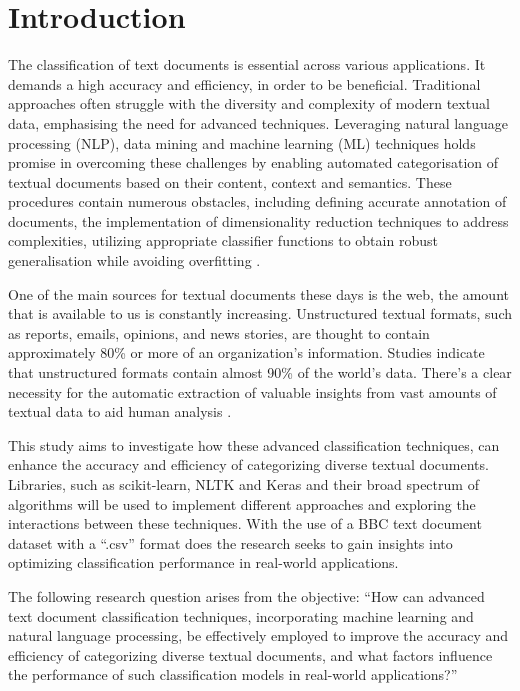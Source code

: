 \chapter{Introduction}

The classification of text documents is essential across various applications. It demands a high accuracy and efficiency, in order to be beneficial. Traditional approaches often struggle with the diversity and complexity of modern textual data, emphasising the need for advanced techniques. Leveraging natural language processing (NLP), data mining and machine learning (ML) techniques holds promise in overcoming these challenges by enabling automated categorisation of textual documents based on their content, context and semantics. These procedures contain numerous obstacles, including defining accurate annotation of documents, the implementation of dimensionality reduction techniques to address complexities, utilizing appropriate classifier functions to obtain robust generalisation while avoiding overfitting \citep{aurangzeb_review_2010}.

One of the main sources for textual documents these days is the web, the amount that is available to us is constantly increasing. Unstructured textual formats, such as reports, emails, opinions, and news stories, are thought to contain approximately 80\% or more of an organization's information. Studies indicate that unstructured formats contain almost 90\% of the world's data. There's a clear necessity for the automatic extraction of valuable insights from vast amounts of textual data to aid human analysis \citep{aurangzeb_review_2010}.

This study aims to investigate how these advanced classification techniques, can enhance the accuracy and efficiency of categorizing diverse textual documents. Libraries, such as scikit-learn, NLTK and Keras and their broad spectrum of algorithms will be used to implement different approaches and exploring the interactions between these techniques. With the use of a BBC text document dataset with a “.csv” format does the research seeks to gain insights into optimizing classification performance in real-world applications.

The following research question arises from the objective: “How can advanced text document classification techniques, incorporating machine learning and natural language processing, be effectively employed to improve the accuracy and efficiency of categorizing diverse textual documents, and what factors influence the performance of such classification models in real-world applications?”



